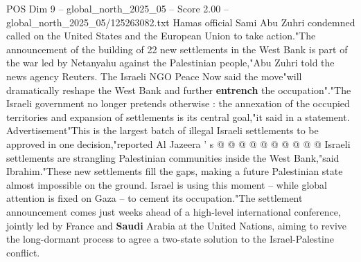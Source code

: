 \begin{textsample}{POS Dim 9 – global\_north\_2025\_05 – Score 2.00 – global\_north\_2025\_05/125263082.txt}
Hamas official Sami Abu Zuhri condemned called on the United States and the European Union to take action."The announcement of the building of 22 new settlements in the West Bank is part of the war led by Netanyahu against the Palestinian people,"Abu Zuhri told the news agency Reuters.
The Israeli NGO Peace Now said the move"will dramatically reshape the West Bank and further \textbf{entrench} the occupation"."The Israeli government no longer pretends otherwise : the annexation of the occupied territories and expansion of settlements is its central goal,"it said in a statement.
Advertisement"This is the largest batch of illegal Israeli settlements to be approved in one decision,"reported Al Jazeera ' s @ @ @ @ @ @ @ @ @ @ Israeli settlements are strangling Palestinian communities inside the West Bank,"said Ibrahim."These new settlements fill the gaps, making a future Palestinian state almost impossible on the ground.
Israel is using this moment -- while global attention is fixed on Gaza -- to cement its occupation."The settlement announcement comes just weeks ahead of a high-level international conference, jointly led by France and \textbf{Saudi} Arabia at the United Nations, aiming to revive the long-dormant process to agree a two-state solution to the Israel-Palestine conflict.

\end{textsample}
